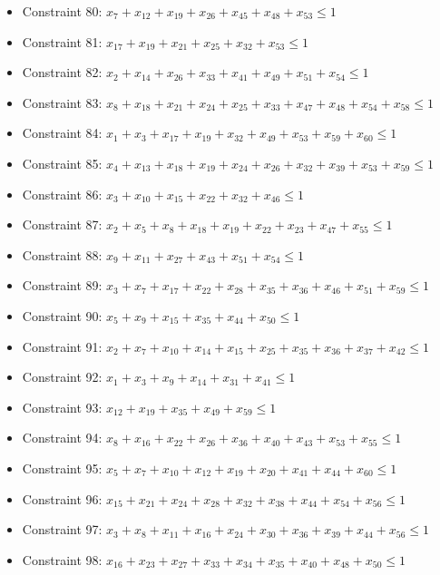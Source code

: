 \documentclass[11pt]{article}
\begin{document}
\begin{itemize}
\item Constraint 80: $x_{7} + x_{12} + x_{19} + x_{26} + x_{45} + x_{48} + x_{53} \le 1$
\item Constraint 81: $x_{17} + x_{19} + x_{21} + x_{25} + x_{32} + x_{53} \le 1$
\item Constraint 82: $x_{2} + x_{14} + x_{26} + x_{33} + x_{41} + x_{49} + x_{51} + x_{54} \le 1$
\item Constraint 83: $x_{8} + x_{18} + x_{21} + x_{24} + x_{25} + x_{33} + x_{47} + x_{48} + x_{54} + x_{58} \le 1$
\item Constraint 84: $x_{1} + x_{3} + x_{17} + x_{19} + x_{32} + x_{49} + x_{53} + x_{59} + x_{60} \le 1$
\item Constraint 85: $x_{4} + x_{13} + x_{18} + x_{19} + x_{24} + x_{26} + x_{32} + x_{39} + x_{53} + x_{59} \le 1$
\item Constraint 86: $x_{3} + x_{10} + x_{15} + x_{22} + x_{32} + x_{46} \le 1$
\item Constraint 87: $x_{2} + x_{5} + x_{8} + x_{18} + x_{19} + x_{22} + x_{23} + x_{47} + x_{55} \le 1$
\item Constraint 88: $x_{9} + x_{11} + x_{27} + x_{43} + x_{51} + x_{54} \le 1$
\item Constraint 89: $x_{3} + x_{7} + x_{17} + x_{22} + x_{28} + x_{35} + x_{36} + x_{46} + x_{51} + x_{59} \le 1$
\item Constraint 90: $x_{5} + x_{9} + x_{15} + x_{35} + x_{44} + x_{50} \le 1$
\item Constraint 91: $x_{2} + x_{7} + x_{10} + x_{14} + x_{15} + x_{25} + x_{35} + x_{36} + x_{37} + x_{42} \le 1$
\item Constraint 92: $x_{1} + x_{3} + x_{9} + x_{14} + x_{31} + x_{41} \le 1$
\item Constraint 93: $x_{12} + x_{19} + x_{35} + x_{49} + x_{59} \le 1$
\item Constraint 94: $x_{8} + x_{16} + x_{22} + x_{26} + x_{36} + x_{40} + x_{43} + x_{53} + x_{55} \le 1$
\item Constraint 95: $x_{5} + x_{7} + x_{10} + x_{12} + x_{19} + x_{20} + x_{41} + x_{44} + x_{60} \le 1$
\item Constraint 96: $x_{15} + x_{21} + x_{24} + x_{28} + x_{32} + x_{38} + x_{44} + x_{54} + x_{56} \le 1$
\item Constraint 97: $x_{3} + x_{8} + x_{11} + x_{16} + x_{24} + x_{30} + x_{36} + x_{39} + x_{44} + x_{56} \le 1$
\item Constraint 98: $x_{16} + x_{23} + x_{27} + x_{33} + x_{34} + x_{35} + x_{40} + x_{48} + x_{50} \le 1$

\end{itemize}
\end{document}
